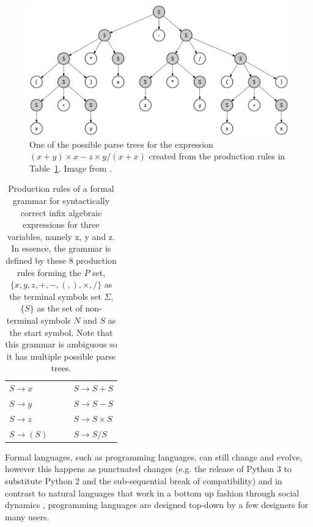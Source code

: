 \begin{figure}[!ht]
\centerline{\includegraphics[width=\textwidth]{figuras/parse_tree_grammar.png}   }
\caption{One of the possible parse trees for the expression $(x + y) \times x - z \times y / (x + x)$ created from the production rules in Table~\ref{table:grammar}. Image from \citet{parse_tree}.}
\label{fig:parsetree}
\end{figure}

\begin{table}[]
\begin{tabular}{llll}
$S \rightarrow x$   &&& $S \rightarrow S + S$      \\
$S \rightarrow y$   &&& $S \rightarrow S - S$      \\
$S \rightarrow z$   &&& $S \rightarrow S \times S$ \\
$S \rightarrow (S)$ &&& $S \rightarrow S / S$     
\end{tabular}
\caption{Production rules of a formal grammar for syntactically correct infix algebraic expressions for three variables, namely x, y and z. In essence, the grammar is defined by these 8 production rules forming the $P$ set, $\{x, y, z, +, -, (, ), \times, /\}$ as the terminal symbols set $\Sigma$, $\{S\}$ as the set of non-terminal symbols $N$ and $S$ as the start symbol. Note that this grammar is ambiguous so it has multiple possible parse trees. }
\label{table:grammar}
\end{table}


Formal languages, such as programming languages, can still change and evolve, however this happens as punctuated changes (e.g. the release of Python 3 to substitute Python 2 and the sub-sequential break of compatibility) and in contrast to natural languages that work in a bottom up fashion through social dynamics \citep{croft2008evolutionary}, programming languages are designed top-down by a few designers for many users.

